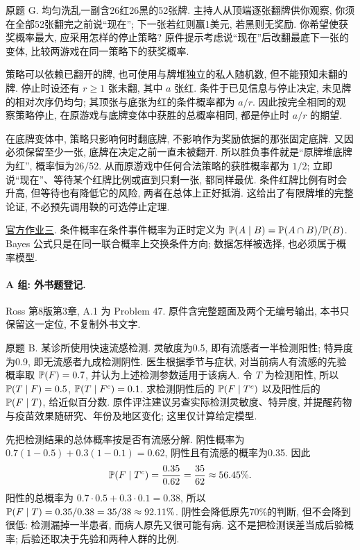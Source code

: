 \begin{exercise}\label{ps2-g}
原题 G. 均匀洗乱一副含26红26黑的52张牌. 主持人从顶端逐张翻牌供你观察, 你须在全部52张翻完之前说“现在”; 下一张若红则赢1美元, 若黑则无奖励. 你希望使获奖概率最大, 应采用怎样的停止策略? 原件提示考虑说“现在”后改翻最底下一张的变体, 比较两游戏在同一策略下的获奖概率.
\end{exercise}
\begin{solution}
策略可以依赖已翻开的牌, 也可使用与牌堆独立的私人随机数, 但不能预知未翻的牌. 停止时设还有 $r\ge1$ 张未翻, 其中 $a$ 张红. 条件于已见信息与停止决定, 未见牌的相对次序仍均匀; 其顶张与底张为红的条件概率都为 $a/r$. 因此按完全相同的观察策略停止, 在原游戏与底牌变体中获胜的总概率相同, 都是停止时 $a/r$ 的期望.

在底牌变体中, 策略只影响何时翻底牌, 不影响作为奖励依据的那张固定底牌. 又因必须保留至少一张, 底牌在决定之前一直未被翻开. 所以胜负事件就是“原牌堆底牌为红”, 概率恒为26/52. 从而原游戏中任何合法策略的获胜概率都为 $1/2$; 立即说“现在”、等待某个红牌比例或直到只剩一张, 都同样最优. 条件红牌比例有时会升高, 但等待也有降低它的风险, 两者在总体上正好抵消. 这给出了有限牌堆的完整论证, 不必预先调用鞅的可选停止定理.
\end{solution}

\href{https://ocw.mit.edu/courses/18-600-probability-and-random-variables-fall-2019/resources/mit18_600f19_pset3/}{官方作业三}. 条件概率在条件事件概率为正时定义为 $\mathbb P(A\mid B)=\mathbb P(A\cap B)/\mathbb P(B)$. Bayes 公式只是在同一联合概率上交换条件方向; 数据怎样被选择, 也必须属于概率模型.

\paragraph{A 组: 外书题登记.}
Ross 第8版第3章, A.1 为 Problem 47. 原件含完整题面及两个无编号输出, 本书只保留这一定位, 不复制外书文字.

\begin{exercise}\label{ps3-b}
原题 B. 某诊所使用快速流感检测. 灵敏度为0.5, 即有流感者一半检测阳性; 特异度为0.9, 即无流感者九成检测阴性. 医生根据季节与症状, 对当前病人有流感的先验概率取 $\mathbb P(F)=0.7$, 并认为上述检测参数适用于该病人. 令 $T$ 为检测阳性, 所以 $\mathbb P(T\mid F)=0.5$, $\mathbb P(T\mid F^c)=0.1$. 求检测阴性后的 $\mathbb P(F\mid T^c)$ 以及阳性后的 $\mathbb P(F\mid T)$, 给近似百分数. 原件评注建议另查实际检测灵敏度、特异度, 并提醒药物与疫苗效果随研究、年份及地区变化; 这里仅计算给定模型.
\end{exercise}
\begin{solution}
先把检测结果的总体概率按是否有流感分解. 阴性概率为 $0.7(1-0.5)+0.3(1-0.1)=0.62$, 阴性且有流感的概率为0.35. 因此
\[
\mathbb P(F\mid T^c)=\frac{0.35}{0.62}=\frac{35}{62}\approx56.45\%.
\]
阳性的总概率为 $0.7\cdot0.5+0.3\cdot0.1=0.38$, 所以
$\mathbb P(F\mid T)=0.35/0.38=35/38\approx92.11\%$.
阴性会降低原先70\%的判断, 但不会降到很低: 检测漏掉一半患者, 而病人原先又很可能有病. 这不是把检测误差当成后验概率; 后验还取决于先验和两种人群的比例.
\end{solution}

